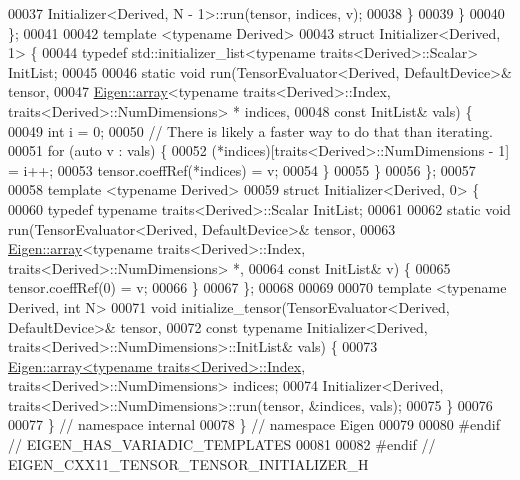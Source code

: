 \begin{DoxyCode}
00037       Initializer<Derived, N - 1>::run(tensor, indices, v);
00038     \}
00039   \}
00040 \};
00041 
00042 \textcolor{keyword}{template} <\textcolor{keyword}{typename} Derived>
00043 \textcolor{keyword}{struct }Initializer<Derived, 1> \{
00044   \textcolor{keyword}{typedef} std::initializer\_list<typename traits<Derived>::Scalar> InitList;
00045 
00046   \textcolor{keyword}{static} \textcolor{keywordtype}{void} run(TensorEvaluator<Derived, DefaultDevice>& tensor,
00047                   \hyperlink{class_eigen_1_1array}{Eigen::array}<\textcolor{keyword}{typename} traits<Derived>::Index, traits<Derived>::NumDimensions>
      * indices,
00048                   \textcolor{keyword}{const} InitList& vals) \{
00049     \textcolor{keywordtype}{int} i = 0;
00050     \textcolor{comment}{// There is likely a faster way to do that than iterating.}
00051     \textcolor{keywordflow}{for} (\textcolor{keyword}{auto} v : vals) \{
00052       (*indices)[traits<Derived>::NumDimensions - 1] = i++;
00053       tensor.coeffRef(*indices) = v;
00054     \}
00055   \}
00056 \};
00057 
00058 \textcolor{keyword}{template} <\textcolor{keyword}{typename} Derived>
00059 \textcolor{keyword}{struct }Initializer<Derived, 0> \{
00060   \textcolor{keyword}{typedef} \textcolor{keyword}{typename} traits<Derived>::Scalar InitList;
00061 
00062   \textcolor{keyword}{static} \textcolor{keywordtype}{void} run(TensorEvaluator<Derived, DefaultDevice>& tensor,
00063                   \hyperlink{class_eigen_1_1array}{Eigen::array}<\textcolor{keyword}{typename} traits<Derived>::Index, traits<Derived>::NumDimensions>
      *,
00064                   \textcolor{keyword}{const} InitList& v) \{
00065     tensor.coeffRef(0) = v;
00066   \}
00067 \};
00068 
00069 
00070 \textcolor{keyword}{template} <\textcolor{keyword}{typename} Derived, \textcolor{keywordtype}{int} N>
00071 \textcolor{keywordtype}{void} initialize\_tensor(TensorEvaluator<Derived, DefaultDevice>& tensor,
00072                        \textcolor{keyword}{const} \textcolor{keyword}{typename} Initializer<Derived, traits<Derived>::NumDimensions>::InitList& vals)
       \{
00073   \hyperlink{class_eigen_1_1array}{Eigen::array<typename traits<Derived>::Index}, 
      traits<Derived>::NumDimensions> indices;
00074   Initializer<Derived, traits<Derived>::NumDimensions>::run(tensor, &indices, vals);
00075 \}
00076 
00077 \}  \textcolor{comment}{// namespace internal}
00078 \}  \textcolor{comment}{// namespace Eigen}
00079 
00080 \textcolor{preprocessor}{#endif  // EIGEN\_HAS\_VARIADIC\_TEMPLATES}
00081 
00082 \textcolor{preprocessor}{#endif  // EIGEN\_CXX11\_TENSOR\_TENSOR\_INITIALIZER\_H}
\end{DoxyCode}
